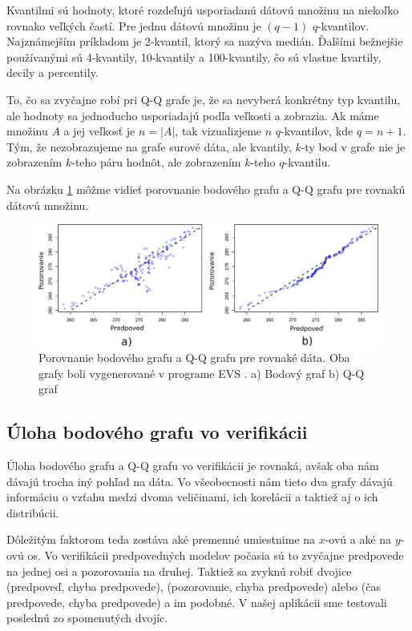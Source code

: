 Kvantilmi sú hodnoty, ktoré rozdeľujú usporiadanú dátovú množinu na niekoľko rovnako veľkých častí. Pre jednu dátovú množinu je $ (q - 1) $ $ q $-kvantilov. Najznámejším príkladom je \mbox{2-kvantil}, ktorý sa nazýva medián. Ďalšími bežnejšie používanými sú \mbox{4-kvantily}, \mbox{10-kvantily} a \mbox{100-kvantily}, čo sú vlastne kvartily, decily a percentily. 

To, čo sa zvyčajne robí pri \mbox{Q-Q} grafe je, že sa nevyberá konkrétny typ kvantilu, ale hodnoty sa jednoducho usporiadajú podľa veľkosti a zobrazia. Ak máme množinu $ A $ a jej veľkosť je $ n = \lvert A \rvert $, tak vizualizjeme $ n $ \mbox{$ q $-kvantilov}, kde $ q = n + 1 $.  Tým, že nezobrazujeme na grafe surové dáta, ale kvantily, \mbox{$ k $-ty} bod v grafe nie je zobrazením \mbox{$ k $-teho} páru hodnôt, ale zobrazením \mbox{$ k $-teho} \mbox{$ q $-kvantilu}. 

Na obrázku \ref{fig:scattervsqq} môžme vidieť porovnanie bodového grafu a \mbox{Q-Q} grafu pre rovnakú dátovú množinu.


\begin{figure}
	\centering
	\includegraphics[width = 5.5in]{scattervsqq}
	\caption{Porovnanie bodového grafu a Q-Q grafu pre rovnaké dáta. Oba grafy boli vygenerované v programe EVS \cite{EVS}. a) Bodový graf b) Q-Q graf }
	\label{fig:scattervsqq}
\end{figure}

\subsection{Úloha bodového grafu vo verifikácii}
Úloha bodového grafu a \mbox{Q-Q} grafu vo verifikácii je rovnaká, avšak oba nám dávajú trocha iný pohľad na dáta. Vo všeobecnosti nám tieto dva grafy dávajú informáciu o vzťahu medzi dvoma veličinami, ich korelácii a taktiež aj o ich distribúcii. 

Dôležitým faktorom teda zostáva aké premenné umiestnime na \mbox{$ x $-ovú} a aké na \mbox{$ y $-ovú} os. Vo verifikácii predpovedných modelov počasia sú to zvyčajne predpovede na jednej osi a pozorovania na druhej. Taktiež sa zvyknú robiť dvojice (predpoveď, chyba predpovede), (pozorovanie, chyba predpovede) alebo (čas predpovede, chyba predpovede) a im podobné. V našej aplikácii sme testovali poslednú zo spomenutých dvojíc.

